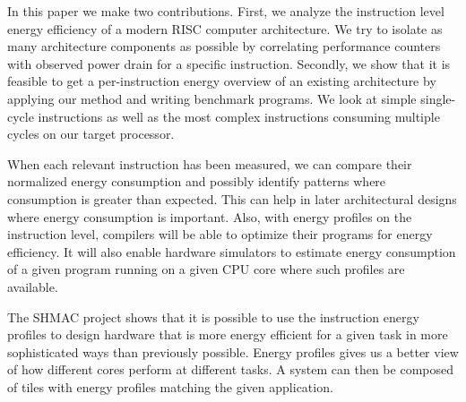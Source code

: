 In this paper we make two contributions. First, we analyze the instruction level
energy efficiency of a modern RISC computer architecture. We try to isolate as
many architecture components as possible by correlating performance counters
with observed power drain for a specific instruction. Secondly, we show that it
is feasible to get a per-instruction energy overview of an existing architecture
by applying our method and writing benchmark programs. We look at simple
single-cycle instructions as well as the most complex instructions consuming
multiple cycles on our target processor.

When each relevant instruction has been measured, we can compare their
normalized energy consumption and possibly identify patterns where consumption
is greater than expected. This can help in later architectural designs where
energy consumption is important. Also, with energy profiles on the instruction
level, compilers will be able to optimize their programs for energy efficiency.
It will also enable hardware simulators to estimate energy consumption of
a given program running on a given CPU core where such profiles are available.

The SHMAC project shows that it is possible to use the instruction energy
profiles to design hardware that is more energy efficient for a given task in
more sophisticated ways than previously possible. Energy profiles gives us a
better view of how different cores perform at different
tasks\cite{kumar2003single}. A system can then be composed of tiles with energy
profiles matching the given application.




